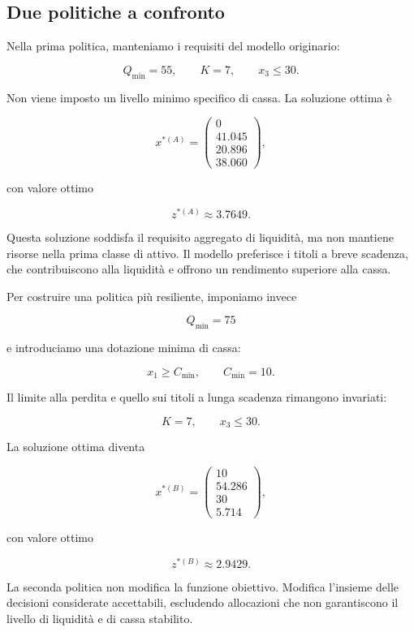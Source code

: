 \subsection{Due politiche a confronto}

Nella prima politica, manteniamo i requisiti del modello originario:

\[
Q_{\min}=55,
\qquad
K=7,
\qquad
x_3\leq30.
\]

Non viene imposto un livello minimo specifico di cassa. La soluzione ottima
\`e

\[
x^{*(A)}
=
\begin{pmatrix}
0\\
41.045\\
20.896\\
38.060
\end{pmatrix},
\]

\noindent con valore ottimo

\[
z^{*(A)}
\approx
3.7649.
\]

Questa soluzione soddisfa il requisito aggregato di liquidit\`a, ma non
mantiene risorse nella prima classe di attivo. Il modello preferisce i titoli
a breve scadenza, che contribuiscono alla liquidit\`a e offrono un rendimento
superiore alla cassa.

Per costruire una politica pi\`u resiliente, imponiamo invece

\[
Q_{\min}=75
\]

\noindent e introduciamo una dotazione minima di cassa:

\[
x_1\geq C_{\min},
\qquad
C_{\min}=10.
\]

Il limite alla perdita e quello sui titoli a lunga scadenza rimangono
invariati:

\[
K=7,
\qquad
x_3\leq30.
\]

La soluzione ottima diventa

\[
x^{*(B)}
=
\begin{pmatrix}
10\\
54.286\\
30\\
5.714
\end{pmatrix},
\]

\noindent con valore ottimo

\[
z^{*(B)}
\approx
2.9429.
\]

La seconda politica non modifica la funzione obiettivo. Modifica l'insieme
delle decisioni considerate accettabili, escludendo allocazioni che non
garantiscono il livello di liquidit\`a e di cassa stabilito.

